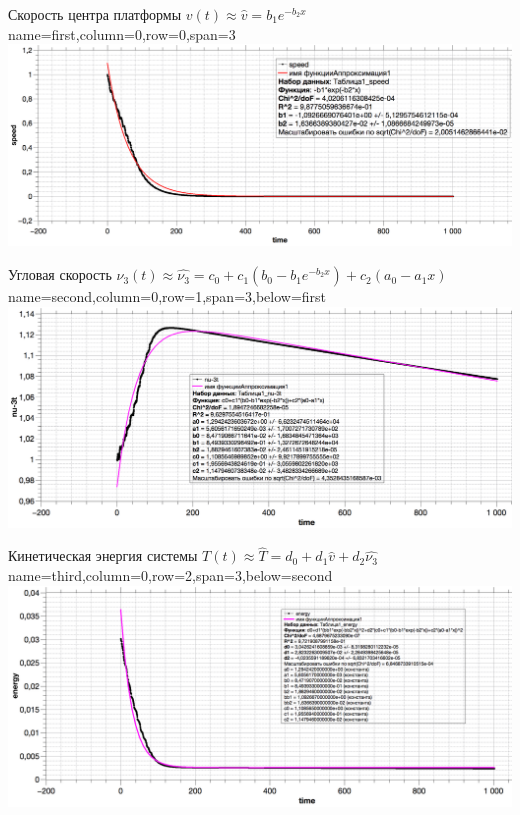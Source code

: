 \begin{mynotitleposter}

    \headerbox
    {\Large{Скорость центра платформы $v(t) \approx \hat{v} = b_1 e^{-b_2 x}$}}
    {name=first,column=0,row=0,span=3}
    {
        {\huge\bf
            \centering
            \includegraphics[width=\linewidth]{content/pic/fit/2_speed.png}
            \vspace{-10pt}
        }
    }
    
    \headerbox
    {\Large{Угловая скорость $\nu_3(t) \approx \hat{\nu_3} = c_0 + c_1(b_0 - b_1 e^{-b_2 x}) + c_2(a_0 - a_1 x)$}}
    {name=second,column=0,row=1,span=3,below=first}
    {
        {\huge\bf
            \centering
            \includegraphics[width=\linewidth]{content/pic/fit/1_nu3.png}
            \vspace{-10pt}
        }
    }
    
    \headerbox
    {\Large{Кинетическая энергия системы $T(t) \approx \hat{T} = d_0 + d_1 \hat{v} + d_2 \hat{\nu_3} $}}
    {name=third,column=0,row=2,span=3,below=second}
    {
        {\huge\bf
            \centering
            \includegraphics[width=\linewidth]{content/pic/fit/3_energy.png}
            \vspace{-10pt}
        }
    }
    
\end{mynotitleposter}